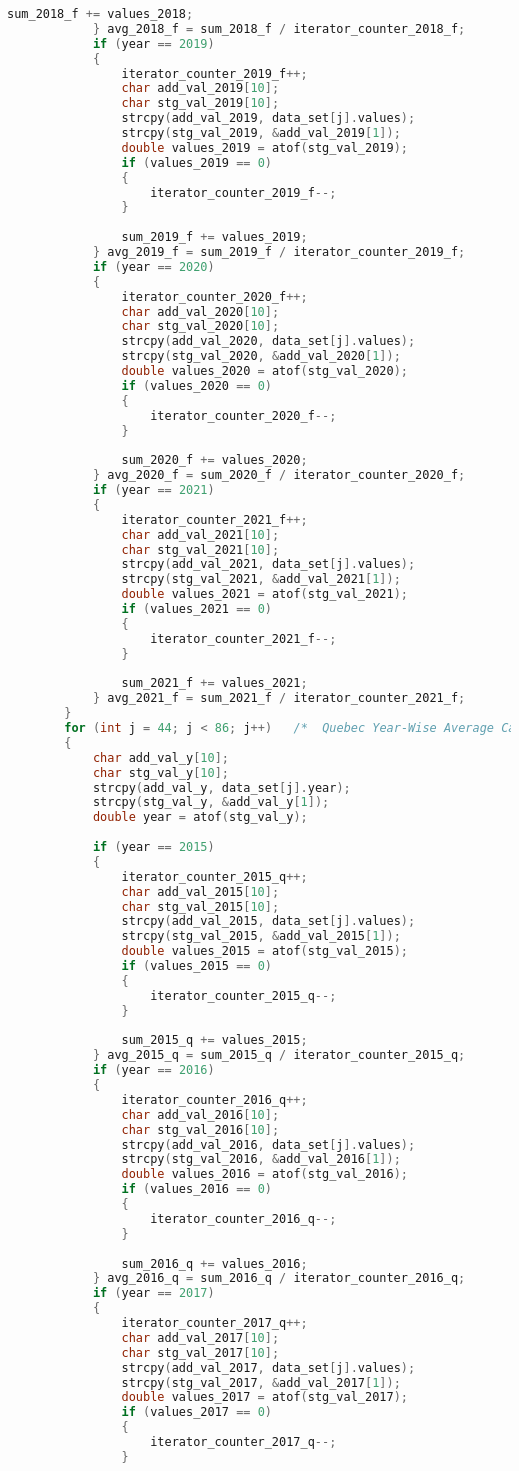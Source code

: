 \begin{lstlisting}[language=C, caption=\textit{CPS 188 Term Project Source Code}]
				sum_2018_f += values_2018;
			} avg_2018_f = sum_2018_f / iterator_counter_2018_f;
			if (year == 2019)
			{
				iterator_counter_2019_f++;
				char add_val_2019[10];
				char stg_val_2019[10];
				strcpy(add_val_2019, data_set[j].values);
				strcpy(stg_val_2019, &add_val_2019[1]);
				double values_2019 = atof(stg_val_2019);
				if (values_2019 == 0)
				{
					iterator_counter_2019_f--;
				}
				
				sum_2019_f += values_2019;
			} avg_2019_f = sum_2019_f / iterator_counter_2019_f;
			if (year == 2020)
			{
				iterator_counter_2020_f++;
				char add_val_2020[10];
				char stg_val_2020[10];
				strcpy(add_val_2020, data_set[j].values);
				strcpy(stg_val_2020, &add_val_2020[1]);
				double values_2020 = atof(stg_val_2020);
				if (values_2020 == 0)
				{
					iterator_counter_2020_f--;
				}
				
				sum_2020_f += values_2020;
			} avg_2020_f = sum_2020_f / iterator_counter_2020_f;
			if (year == 2021)
			{
				iterator_counter_2021_f++;
				char add_val_2021[10];
				char stg_val_2021[10];
				strcpy(add_val_2021, data_set[j].values);
				strcpy(stg_val_2021, &add_val_2021[1]);
				double values_2021 = atof(stg_val_2021);
				if (values_2021 == 0)
				{
					iterator_counter_2021_f--;
				}
				
				sum_2021_f += values_2021;
			} avg_2021_f = sum_2021_f / iterator_counter_2021_f;
		}
		for (int j = 44; j < 86; j++)	/*	Quebec Year-Wise Average Calculator	*/
		{
			char add_val_y[10];
			char stg_val_y[10];
			strcpy(add_val_y, data_set[j].year);
			strcpy(stg_val_y, &add_val_y[1]);
			double year = atof(stg_val_y);
			
			if (year == 2015)
			{
				iterator_counter_2015_q++;
				char add_val_2015[10];
				char stg_val_2015[10];
				strcpy(add_val_2015, data_set[j].values);
				strcpy(stg_val_2015, &add_val_2015[1]);
				double values_2015 = atof(stg_val_2015);
				if (values_2015 == 0)
				{
					iterator_counter_2015_q--;
				}
				
				sum_2015_q += values_2015;
			} avg_2015_q = sum_2015_q / iterator_counter_2015_q;
			if (year == 2016)
			{
				iterator_counter_2016_q++;
				char add_val_2016[10];
				char stg_val_2016[10];
				strcpy(add_val_2016, data_set[j].values);
				strcpy(stg_val_2016, &add_val_2016[1]);
				double values_2016 = atof(stg_val_2016);
				if (values_2016 == 0)
				{
					iterator_counter_2016_q--;
				}
				
				sum_2016_q += values_2016;
			} avg_2016_q = sum_2016_q / iterator_counter_2016_q;
			if (year == 2017)
			{
				iterator_counter_2017_q++;
				char add_val_2017[10];
				char stg_val_2017[10];
				strcpy(add_val_2017, data_set[j].values);
				strcpy(stg_val_2017, &add_val_2017[1]);
				double values_2017 = atof(stg_val_2017);
				if (values_2017 == 0)
				{
					iterator_counter_2017_q--;
				}
				

\end{lstlisting}
